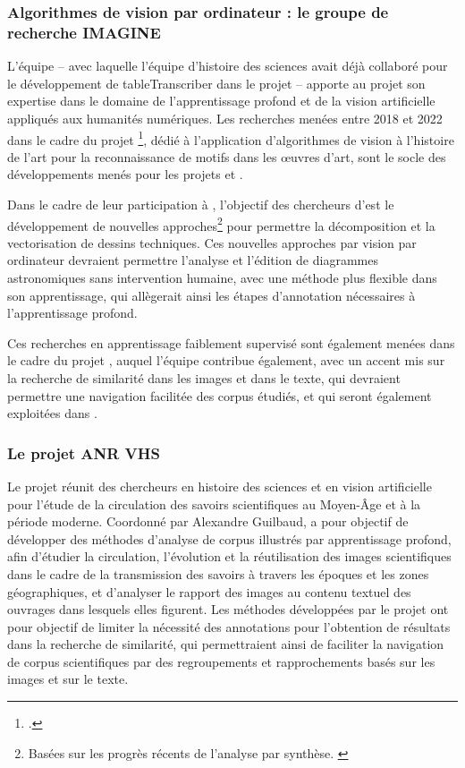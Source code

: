     \subsubsection{Algorithmes de vision par ordinateur : le groupe de recherche IMAGINE}
	L'équipe \imagine -- avec laquelle l'équipe d'histoire des sciences avait déjà collaboré pour le développement de tableTranscriber dans le projet \dishas -- apporte au projet \eida son expertise dans le domaine de l'apprentissage profond et de la vision artificielle appliqués aux humanités numériques. Les recherches menées entre 2018 et 2022 dans le cadre du projet \enherit\footcite{EnhancingHeritageImage}, dédié à l'application d'algorithmes de vision à l'histoire de l'art pour la reconnaissance de motifs dans les œuvres d'art, sont le socle des développements menés pour les projets \eida et \vhs. 
	
	Dans le cadre de leur participation à \eida, l'objectif des chercheurs d'\imagine est le développement de nouvelles approches\footnote{Basées sur les progrès récents de l'analyse par synthèse. \cite{monnierUnsupervisedLayeredImage2021}} pour permettre la décomposition et la vectorisation de dessins techniques. Ces nouvelles approches par vision par ordinateur devraient permettre l'analyse et l'édition de diagrammes astronomiques sans intervention humaine, avec une méthode plus flexible dans son apprentissage, qui allègerait ainsi les étapes d'annotation nécessaires à l'apprentissage profond.
	
	Ces recherches en apprentissage faiblement supervisé sont également menées dans le cadre du projet \vhs, auquel l'équipe \imagine contribue également, avec un accent mis sur la recherche de similarité dans les images et dans le texte, qui devraient permettre une navigation facilitée des corpus étudiés, et qui seront également exploitées dans \eida.

    \subsubsection{Le projet ANR VHS}
	Le projet \vhs réunit des chercheurs en histoire des sciences et en vision artificielle pour l'étude de la circulation des savoirs scientifiques au Moyen-Âge et à la période moderne. Coordonné par Alexandre Guilbaud, \vhs a pour objectif de développer des méthodes d'analyse de corpus illustrés par apprentissage profond, afin d'étudier la circulation, l'évolution et la réutilisation des images scientifiques dans le cadre de la transmission des savoirs à travers les époques et les zones géographiques, et d'analyser le rapport des images au contenu textuel des ouvrages dans lesquels elles figurent. Les méthodes développées par le projet ont pour objectif de limiter la nécessité des annotations pour l'obtention de résultats dans la recherche de similarité, qui permettraient ainsi de faciliter la navigation de corpus scientifiques par des regroupements et rapprochements basés sur les images et sur le texte.
	
